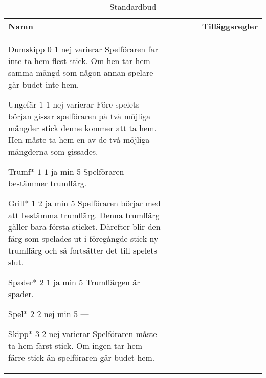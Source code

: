 %
%
%
%

\begin{table}
	\caption{Standardbud}\label{tab:standardBids}
	\begin{center}
		\begin{tabularx}{\textwidth}{lcccc|X}
				\textbf{Namn} &
				\rotccw{\textbf{Värde}} &
				\rotccw{\textbf{Poäng}} &
				\rotccw{\textbf{Trumf}} &
				\rotccw{\textbf{Stick}} &
				\textbf{Tilläggsregler}
				\\[-3ex]

				\standardBidItem%
				{Dumskipp}
				{$0$}
				{$1$}
				{nej}
				{varierar}
				{%
					Spelföraren får inte ta hem flest stick. Om hen tar hem samma mängd som någon annan spelare går budet inte hem.
				}

				\standardBidItem%
				{Ungefär}
				{$1$}
				{$1$}
				{nej}
				{varierar}
				{%
					Före spelets början gissar spelföraren på två möjliga mängder stick denne kommer att ta hem. Hen måste ta hem en av de två möjliga mängderna som gissades.
				}

				\standardBidItem%
				{Trumf*}
				{$1$}
				{$1$}
				{ja}
				{min 5}
				{%
					Spelföraren bestämmer trumffärg.
				}

				\standardBidItem%
				{Grill*}
				{$1$}
				{$2$}
				{ja}
				{min 5}
				{%
					Spelföraren börjar med att bestämma trumffärg. Denna trumffärg gäller bara första sticket. Därefter blir den färg som spelades ut i föregångde stick ny trumffärg och så fortsätter det till spelets slut.
				}
				
				\standardBidItem%
				{Spader*}
				{$2$}
				{$1$}
				{ja}
				{min 5}
				{%
					Trumffärgen är spader.
				}

				\standardBidItem%
				{Spel*}
				{$2$}
				{$2$}
				{nej}
				{min 5}
				{%
					---
				}

				\standardBidItem%
				{Skipp*}
				{$3$}
				{$2$}
				{nej}
				{varierar}
				{%
					Spelföraren måste ta hem färst stick. Om ingen tar hem färre stick än spelföraren går budet hem.
				}


\end{tabularx}
\end{center}
\end{table}
